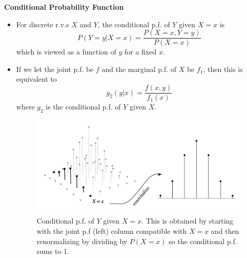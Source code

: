 \documentclass[11pt]{article}
\begin{document}
\textbf{Conditional Probability Function}
\begin{itemize}
    \item For discrete r.v.s $X$ and $Y$, the conditional p.f. of $Y$ given $X=x$ is 
    \[ P(Y=y | X=x) = \frac{P(X=x, Y=y)}{P(X=x)}\]
    which is viewed as a function of $y$ for a fixed $x$.
    \item If we let the joint p.f. be $f$ and the marginal p.f. of $X$ be $f_1$, then this is 
    equivalent to
    \[g_2(y|x) = \frac{f(x,y)}{f_1(x)}\]
    where $g_2$ is the conditional p.f. of $Y$ given $X$.
    \begin{figure}[H] 
        \centering 
        \includegraphics[width=6in]{imgs/conditional_pf.png}
        \caption{Conditional p.f. of $Y$ given $X=x$. This is obtained by starting with the 
        joint p.f (left) column compatible with $X=x$ and then renormalizing by dividing by 
        $P(X=x)$ so the conditional p.f. sums to 1.}
    \end{figure}
\end{itemize}
\end{document}
